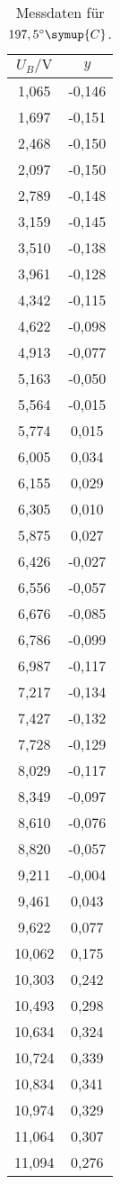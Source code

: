 \begin{longtable}{c c}
	\caption{Messdaten für $197,5^\circ \symup{C}$.}
	\label{tab:1975}\\
	\hline
	$U_B / \si{\volt}$ & $y$ \\
	\hline
	1,065&-0,146 \\
	1,697&-0,151 \\
	2,468&-0,150 \\
	2,097&-0,150 \\
	2,789&-0,148 \\
	3,159&-0,145 \\
	3,510&-0,138 \\
	3,961&-0,128 \\
	4,342&-0,115 \\
	4,622&-0,098 \\
	4,913&-0,077 \\
	5,163&-0,050 \\
	5,564&-0,015 \\
	5,774&0,015 \\
	6,005&0,034 \\
	6,155&0,029 \\
	6,305&0,010 \\
	5,875&0,027 \\
	6,426&-0,027 \\
	6,556&-0,057 \\
	6,676&-0,085 \\
	6,786&-0,099 \\
	6,987&-0,117 \\
	7,217&-0,134 \\
	7,427&-0,132 \\
	7,728&-0,129 \\
	8,029&-0,117 \\
	8,349&-0,097 \\
	8,610&-0,076 \\
	8,820&-0,057 \\
	9,211&-0,004 \\
	9,461&0,043 \\
	9,622&0,077 \\
	10,062&0,175 \\
	10,303&0,242 \\
	10,493&0,298 \\
	10,634&0,324 \\
	10,724&0,339 \\
	10,834&0,341 \\
	10,974&0,329 \\
	11,064&0,307 \\
	11,094&0,276 \\

\end{longtable}
